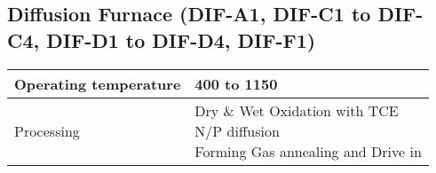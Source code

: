 \subsection{Diffusion Furnace (DIF-A1, DIF-C1 to DIF-C4, DIF-D1 to DIF-D4, DIF-F1)}\label{diffusion_furnace_machine}
\WaferClean\WaferSemiClean\WaferNonStandard

	\begin{tabular}{|p{4cm}|p{8cm}|}
		\hline
		Operating temperature &
		400 to 1150 \degreesC \\
		\hline
		Processing &
		\makecell[l]{
			\tabitem Dry \& Wet Oxidation with TCE\\
			\tabitem N/P diffusion \\
			\tabitem Forming Gas annealing and Drive in
		} \\
		\hline
	\end{tabular}
